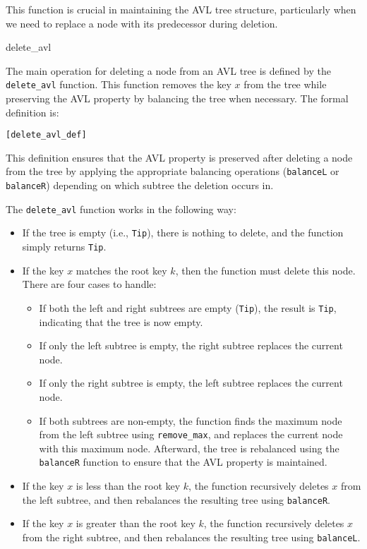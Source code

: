 This function is crucial in maintaining the AVL tree structure, particularly when we need to replace a node with its predecessor during deletion.

\begin{defn}{delete\_avl}

The main operation for deleting a node from an AVL tree is defined by the \texttt{delete\_avl} function. This function removes the key \( x \) from the tree while preserving the AVL property by balancing the tree when necessary. The formal definition is:


\begin{alltt}
	[delete_avl_def]
\end{alltt}

This definition ensures that the AVL property is preserved after deleting a node from the tree by applying the appropriate balancing operations (\texttt{balanceL} or \texttt{balanceR}) depending on which subtree the deletion occurs in.
\end{defn}


The \texttt{delete\_avl} function works in the following way:
\begin{itemize}
    \item If the tree is empty (i.e., \texttt{Tip}), there is nothing to delete, and the function simply returns \texttt{Tip}.
    \item If the key \( x \) matches the root key \( k \), then the function must delete this node. There are four cases to handle:
    \begin{itemize}
        \item If both the left and right subtrees are empty (\texttt{Tip}), the result is \texttt{Tip}, indicating that the tree is now empty.
        \item If only the left subtree is empty, the right subtree replaces the current node.
        \item If only the right subtree is empty, the left subtree replaces the current node.
        \item If both subtrees are non-empty, the function finds the maximum node from the left subtree using \texttt{remove\_max}, and replaces the current node with this maximum node. Afterward, the tree is rebalanced using the \texttt{balanceR} function to ensure that the AVL property is maintained.
    \end{itemize}
    \item If the key \( x \) is less than the root key \( k \), the function recursively deletes \( x \) from the left subtree, and then rebalances the resulting tree using \texttt{balanceR}.
    \item If the key \( x \) is greater than the root key \( k \), the function recursively deletes \( x \) from the right subtree, and then rebalances the resulting tree using \texttt{balanceL}.
\end{itemize}

